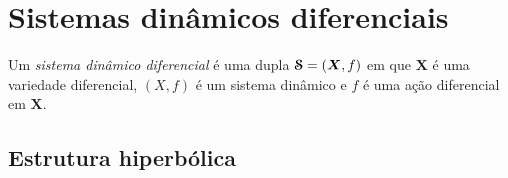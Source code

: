 \chapter{Sistemas dinâmicos diferenciais}

\begin{definition}
Um \emph{sistema dinâmico diferencial} é uma dupla $\bm{\mathcal{S}}=(\bm X,f)$ em que $\bm X$ é uma variedade diferencial, $(X,f)$ é um sistema dinâmico e $f$ é uma ação diferencial em $\bm X$.
\end{definition}

\section{Estrutura hiperbólica}

